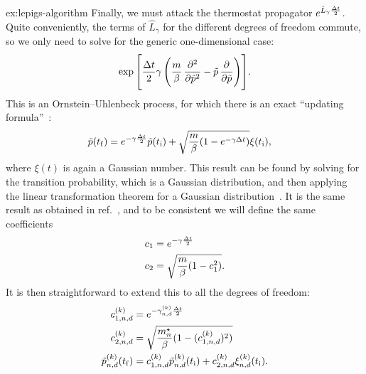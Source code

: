 \begin{DefAnswer}{ex:lepigs-algorithm}
	Finally, we must attack the thermostat propagator $e^{\hat{L}_\gamma \frac{\Delta t}{2}}$.
	Quite conveniently, the terms of $\hat{L}_\gamma$ for the different degrees of freedom commute, so we only need to solve for the generic one-dimensional case:
	\begin{align}
		\expb{\frac{\dt}{2} \gamma \left( \frac{m}{\beta} \dpd[2]{}{\nm{p}} - \nm{p} \dpd{}{\nm{p}} \right)}.
	\end{align}
	This is an Ornstein--Uhlenbeck process, for which there is an exact ``updating formula''~\cite[551]{gillespie1992markov}:
	\begin{align}
		\tilde{p}(t_\mathrm{f})
		&= e^{-\gamma \frac{\Delta t}{2}} \tilde{p}(t_\mathrm{i}) + \sqrt{\frac{m}{\beta} (1 - e^{-\gamma \Delta t})} \xi(t_\mathrm{i}),
	\end{align}
	where $\xi(t)$ is again a Gaussian number.
	This result can be found by solving for the transition probability, which is a Gaussian distribution, and then applying the linear transformation theorem for a Gaussian distribution~\cite[27-28]{gillespie1992markov}.
	It is the same result as obtained in ref.~\cite{bussi2007accurate}, and to be consistent we will define the same coefficients
	\begin{subequations}
	\begin{align}
		c_1
		&= e^{-\gamma \frac{\Delta t}{2}} \\
		c_2
		&= \sqrt{\frac{m}{\beta} (1 - c_1^2)}.
	\end{align}
	\end{subequations}
	It is then straightforward to extend this to all the degrees of freedom:
	\begin{subequations}
	\begin{align}
		c_{1,n,d}^{(k)}
		&= e^{-\gamma_{n,d}^{(k)} \frac{\Delta t}{2}} \\
		c_{2,n,d}^{(k)}
		&= \sqrt{\frac{{m}^\star_n}{\beta} (1 - (c_{1,n,d}^{(k)})^2)} \\
		\tilde{p}_{n,d}^{(k)}(t_\mathrm{f})
		&= c_{1,n,d}^{(k)} \tilde{p}_{n,d}^{(k)}(t_\mathrm{i}) + c_{2,n,d}^{(k)} \xi_{n,d}^{(k)}(t_\mathrm{i}).
	\end{align}
	\end{subequations}


\end{DefAnswer}
